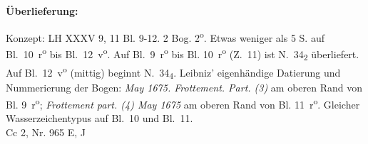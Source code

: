 \begin{ledgroupsized}[r]{120mm}
\footnotesize
\pstart
\noindent\textbf{\"{U}berlieferung:}
\pend
\end{ledgroupsized}
%
\begin{ledgroupsized}[r]{114mm}
\footnotesize
\pstart
\parindent -6mm
Konzept: LH XXXV 9, 11 Bl. 9-12. 2 Bog. 2\textsuperscript{o}. Etwas weniger als 5  S. auf Bl.~10~r\textsuperscript{o} bis Bl.~12~v\textsuperscript{o}.
Auf Bl.~9~r\textsuperscript{o} bis Bl. 10~r\textsuperscript{o} (Z.~11)
 ist N.~34\textsubscript{2} überliefert.
Auf Bl.~12~v\textsuperscript{o} (mittig) beginnt N.~34\textsubscript{4}.
Leibniz' eigenh\"{a}ndige Datierung und Nummerierung der Bogen:
\textit{May 1675. Frottement. Part. (3)} am oberen Rand von Bl. 9~r\textsuperscript{o};
\textit{Frottement part. (4) May 1675} am oberen Rand von Bl. 11~r\textsuperscript{o}.
Gleicher Wasserzeichentypus auf Bl.~10 und Bl.~11.\\
Cc 2, Nr. 965 E, J
\pend
\end{ledgroupsized}
%
%
\vspace*{8mm}
\count{}
